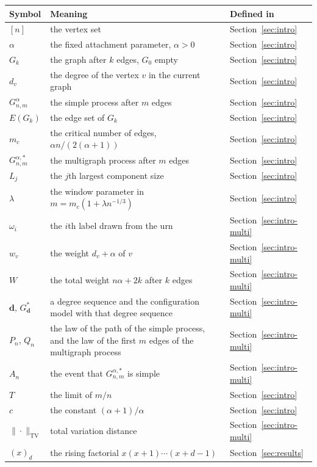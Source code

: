 \documentclass[11pt]{amsart}
\theoremstyle{remark}
\numberwithin{equation}{section}
\newcommand{\TV}{\mathrm{TV}}
\begin{document}
{\small\begin{longtable}{@{}lp{}l@{}}\toprule
Symbol & Meaning & Defined in \\ \midrule
\endhead
$[n]$ & the vertex set & Section~\ref{sec:intro} \\
$\alpha$ & the fixed attachment parameter, $\alpha>0$ & Section~\ref{sec:intro} \\
$G_k$ & the graph after $k$ edges, $G_0$ empty & Section~\ref{sec:intro} \\
$d_v$ & the degree of the vertex $v$ in the current graph & Section~\ref{sec:intro} \\
$G^\alpha_{n,m}$ & the simple process after $m$ edges & Section~\ref{sec:intro} \\
$E(G_k)$ & the edge set of $G_k$ & Section~\ref{sec:intro} \\
$m_c$ & the critical number of edges, $\alpha n/(2(\alpha+1))$ & Section~\ref{sec:intro} \\
$G^{\alpha,*}_{n,m}$ & the multigraph process after $m$ edges & Section~\ref{sec:intro} \\
$L_j$ & the $j$th largest component size & Section~\ref{sec:intro} \\
$\lambda$ & the window parameter in $m=m_c(1+\lambda n^{-1/3})$ & Section~\ref{sec:intro} \\
$\omega_i$ & the $i$th label drawn from the urn & Section~\ref{sec:intro-multi} \\
$w_v$ & the weight $d_v+\alpha$ of $v$ & Section~\ref{sec:intro-multi} \\
$W$ & the total weight $n\alpha+2k$ after $k$ edges & Section~\ref{sec:intro-multi} \\
$\boldsymbol d$, $G^*_{\boldsymbol d}$ & a degree sequence and the configuration model with that degree sequence & Section~\ref{sec:intro-multi} \\
$P_n$, $Q_n$ & the law of the path of the simple process, and the law of the first $m$ edges of the multigraph process & Section~\ref{sec:intro-multi} \\
$A_n$ & the event that $G^{\alpha,*}_{n,m}$ is simple & Section~\ref{sec:intro-multi} \\
$T$ & the limit of $m/n$ & Section~\ref{sec:intro} \\
$c$ & the constant $(\alpha+1)/\alpha$ & Section~\ref{sec:intro} \\
$\|\cdot\|_{\TV}$ & total variation distance & Section~\ref{sec:intro-multi} \\
$(x)_d$ & the rising factorial $x(x+1)\cdots(x+d-1)$ & Section~\ref{sec:results} \\

\end{longtable}}
\end{document}
